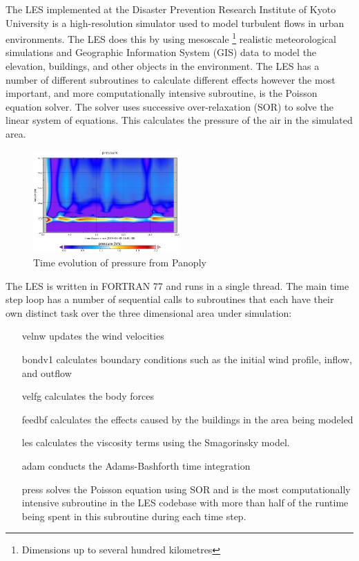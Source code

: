 The LES implemented at the Disaster Prevention Research Institute of Kyoto
University is a high-resolution simulator used to model turbulent flows in urban
environments. The LES does this by using mesoscale \footnote{Dimensions up to
several hundred kilometres} realistic meteorological simulations and Geographic
Information System (GIS) data to model the elevation, buildings, and other
objects in the environment. The LES has a number of different subroutines to
calculate different effects however the most important, and more computationally
intensive subroutine, is the Poisson equation solver. The solver uses successive
over-relaxation (SOR) to solve the linear system of equations. This calculates
the pressure of the air in the simulated area.

\begin{figure}
    \includegraphics[width=0.5\textwidth]{graphs/pressure_in_LES_output_p.png}
    \caption{Time evolution of pressure from Panoply}
    \label{fig:lespressure}
\end{figure}

The LES is written in FORTRAN 77 and runs in a single thread. The main time step
loop has a number of sequential calls to subroutines that each have their own
distinct task over the three dimensional area under simulation:

\begin{itemize}[noitemsep,nolistsep]

    \item[velnw] updates the wind velocities

    \item[bondv1] calculates boundary conditions such as the initial wind
    profile, inflow, and outflow

    \item[velfg] calculates the body forces

    \item[feedbf] calculates the effects caused by the buildings in the area
    being modeled

    \item[les] calculates the viscosity terms using the Smagorinsky model.

    \item[adam] conducts the Adams-Bashforth time integration

    \item[press] solves the Poisson equation using SOR and is the most
    computationally intensive subroutine in the LES codebase with more than half
    of the runtime being spent in this subroutine during each time step.

\end{itemize}

